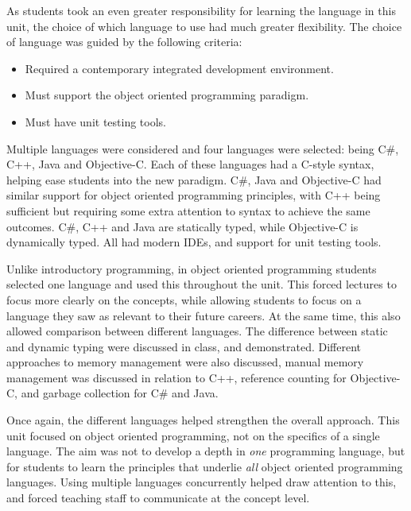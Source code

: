 As students took an even greater responsibility for learning the language in this unit, the choice of which language to use had much greater flexibility. The choice of language was guided by the following criteria:

\begin{itemize}[noitemsep,nolistsep]
	\item Required a contemporary integrated development environment.
	\item Must support the object oriented programming paradigm.
	\item Must have unit testing tools.
\end{itemize}

Multiple languages were considered and four languages were selected: being C\#, C++, Java and Objective-C. Each of these languages had a C-style syntax, helping ease students into the new paradigm. C\#, Java and Objective-C had similar support for object oriented programming principles, with C++ being sufficient but requiring some extra attention to syntax to achieve the same outcomes. C\#, C++ and Java are statically typed, while Objective-C is dynamically typed. All had modern IDEs, and support for unit testing tools.

Unlike introductory programming, in object oriented programming students selected one language and used this throughout the unit. This forced lectures to focus more clearly on the concepts, while allowing students to focus on a language they saw as relevant to their future careers. At the same time, this also allowed comparison between different languages. The difference between static and dynamic typing were discussed in class, and demonstrated. Different approaches to memory management were also discussed, manual memory management was discussed in relation to C++, reference counting for Objective-C, and garbage collection for C\# and Java. 

Once again, the different languages helped strengthen the overall approach. This unit focused on object oriented programming, not on the specifics of a single language. The aim was not to develop a depth in \emph{one} programming language, but for students to learn the principles that underlie \emph{all} object oriented programming languages. Using multiple languages concurrently helped draw attention to this, and forced teaching staff to communicate at the concept level. 


